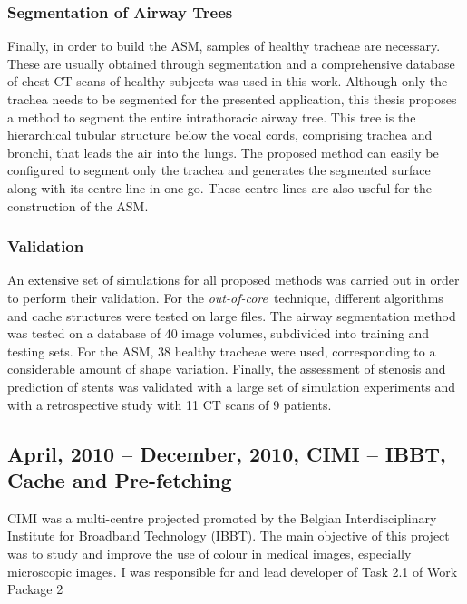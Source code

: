 \documentclass[a4paper]{article}
\newcommand{\outcore}{\textit{out-of-core}}
\begin{document}
\subsubsection{Segmentation of Airway Trees}

Finally, in order to build the ASM, samples of healthy tracheae are necessary. These are usually obtained through segmentation and a comprehensive database of chest CT scans of healthy subjects was used in this work. Although only the trachea needs to be segmented for the presented application, this thesis proposes a method to segment the entire intrathoracic airway tree. This tree is the hierarchical tubular structure below the vocal cords, comprising trachea and bronchi, that leads the air into the lungs. The proposed method can easily be configured to segment only the trachea and generates the segmented surface along with its centre line in one go. These centre lines are also useful for the construction of the ASM. 

\subsubsection{Validation}

An extensive set of simulations for all proposed methods was carried out in order to perform their validation. For the \outcore\ technique, different algorithms and cache structures were tested on large files. The airway segmentation method was tested on a database of 40 image volumes, subdivided into training and testing sets. For the ASM, 38 healthy tracheae were used, corresponding to a considerable amount of shape variation. Finally, the assessment of stenosis and prediction of stents was validated with a large set of simulation experiments and with a retrospective study with 11 CT scans of 9 patients.

\renewcommand{\refname}{Related publications}
\begin{bibunit}[unsrt]
\nocite{Pinho:Trachea4}
\nocite{Pinho:Trachea5}
\nocite{Pinho:Trachea6}
\nocite{Pinho:Airways2}
\nocite{Pinho:Trachea3}
\nocite{Pinho:Trachea2}
\nocite{Pinho:Trachea1}
\nocite{Pinho:Airways1}
\putbib[mybib]
\end{bibunit}

\subsection{April, 2010 -- December, 2010, CIMI -- IBBT, Cache and Pre-fetching}

CIMI was a multi-centre projected promoted by the Belgian Interdisciplinary Institute for Broadband Technology (IBBT). The main objective of this project was to study and improve the use of colour in medical images, especially microscopic images. I was responsible for and lead developer of Task 2.1 of Work Package 2
\end{document}
